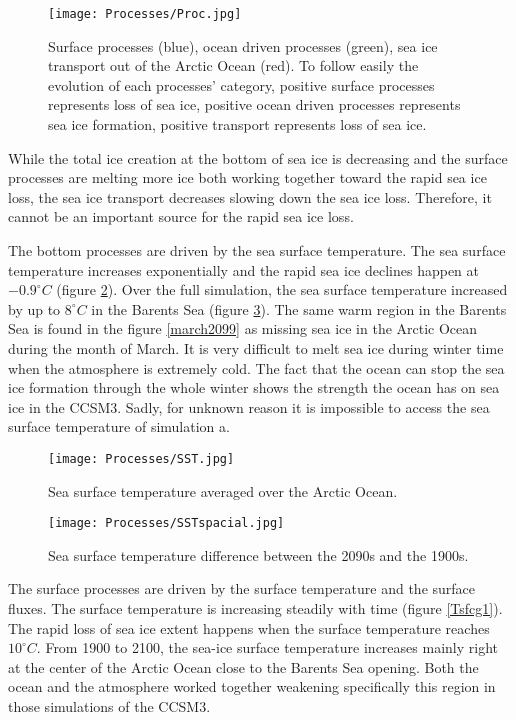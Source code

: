 \begin{figure}
\center
\noindent\texttt{[image: Processes/Proc.jpg]}
\caption{Surface processes (blue), ocean driven processes (green), sea ice transport out of the Arctic Ocean (red). To follow easily the evolution of each processes' category, positive surface processes represents loss of sea ice, positive ocean driven processes represents sea ice formation, positive transport represents loss of sea ice.}
\label{procG}
\end{figure}

While the total ice creation at the bottom of sea ice is decreasing and the surface processes are melting more ice both working together toward the rapid sea ice loss, the sea ice transport decreases slowing down the sea ice loss. Therefore, it cannot be an important source for the rapid sea ice loss. 

The bottom processes are driven by the sea surface temperature. The sea surface temperature increases exponentially and the rapid sea ice declines happen at $-0.9^\circ C$ (figure \ref{SSTg1}). Over the full simulation, the sea surface temperature increased by up to $8^\circ C$ in the Barents Sea (figure \ref{SSTg2}). The same warm region in the Barents Sea is found in the figure \ref{march2099} as missing sea ice in the Arctic Ocean during the month of March. It is very difficult to melt sea ice during winter time when the atmosphere is extremely cold. The fact that the ocean can stop the sea ice formation through the whole winter shows the strength the ocean has on sea ice in the CCSM3. Sadly, for unknown reason it is impossible to access the sea surface temperature of simulation a. 

\begin{figure}
\center
\noindent\texttt{[image: Processes/SST.jpg]}
\caption{Sea surface temperature averaged over the Arctic Ocean.}
\label{SSTg1}
\end{figure}

\begin{figure}
\center
\noindent\texttt{[image: Processes/SSTspacial.jpg]}
\caption{Sea surface temperature difference between the 2090s and the 1900s.}
\label{SSTg2}
\end{figure}

The surface processes are driven by the surface temperature and the surface fluxes. The surface temperature is increasing steadily with time (figure \ref{Tsfcg1}). The rapid loss of sea ice extent happens when the surface temperature reaches $10^\circ C$. From 1900 to 2100, the sea-ice surface temperature increases mainly right at the center of the Arctic Ocean close to the Barents Sea opening. Both the ocean and the atmosphere worked together weakening specifically this region in those simulations of the CCSM3. 

